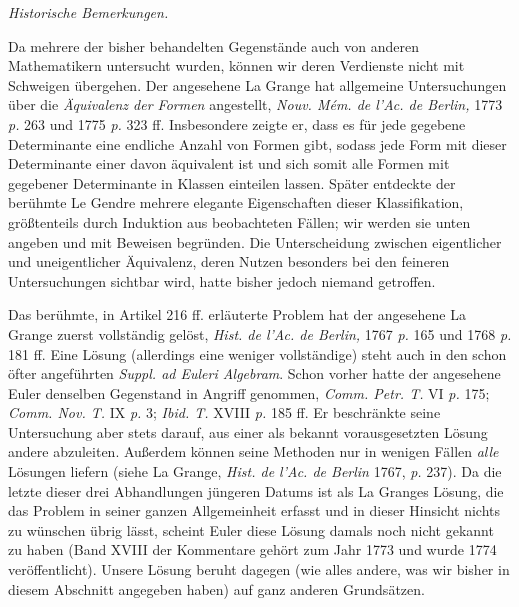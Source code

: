 \begin{center}
\textit{Historische Bemerkungen.}
\end{center}

Da mehrere der bisher behandelten Gegenstände auch von anderen Mathematikern untersucht wurden, können wir deren Verdienste nicht mit Schweigen übergehen. Der angesehene La Grange hat allgemeine Untersuchungen über die \textit{Äquivalenz der Formen} angestellt, \textit{Nouv. M\'em. de l'Ac. de Berlin,} 1773 \textit{p.} 263 und 1775 \textit{p.} 323 ff. Insbesondere zeigte er, dass es für jede gegebene Determinante eine endliche Anzahl von Formen gibt, sodass jede Form mit dieser Determinante einer davon äquivalent ist und sich somit alle Formen mit gegebener Determinante in Klassen einteilen lassen. Später entdeckte der berühmte Le Gendre mehrere elegante Eigenschaften dieser Klassifikation, größtenteils durch Induktion aus beobachteten Fällen; wir werden sie unten angeben und mit Beweisen begründen. Die Unterscheidung zwischen eigentlicher und uneigentlicher Äquivalenz, deren Nutzen besonders bei den feineren Untersuchungen sichtbar wird, hatte bisher jedoch niemand getroffen.

Das berühmte, in Artikel 216 ff. erläuterte Problem hat der angesehene La Grange zuerst vollständig gelöst, \textit{Hist. de l'Ac. de Berlin,} 1767 \textit{p.} 165 und 1768 \textit{p.} 181 ff. Eine Lösung (allerdings eine weniger vollständige) steht auch in den schon öfter angeführten \textit{Suppl. ad Euleri Algebram}. Schon vorher hatte der angesehene Euler denselben Gegenstand in Angriff genommen, \textit{Comm. Petr. T.} VI \textit{p.} 175; \textit{Comm. Nov. T.} IX \textit{p.} 3; \textit{Ibid. T.} XVIII \textit{p.} 185 ff. Er beschränkte seine Untersuchung aber stets darauf, aus einer als bekannt vorausgesetzten Lösung andere abzuleiten. Außerdem können seine Methoden nur in wenigen Fällen \textit{alle} Lösungen liefern (siehe La Grange, \textit{Hist. de l'Ac. de Berlin} 1767, \textit{p.} 237). Da die letzte dieser drei Abhandlungen jüngeren Datums ist als La Granges Lösung, die das Problem in seiner ganzen Allgemeinheit erfasst und in dieser Hinsicht nichts zu wünschen übrig lässt, scheint Euler diese Lösung damals noch nicht gekannt zu haben (Band XVIII der Kommentare gehört zum Jahr 1773 und wurde 1774 veröffentlicht). Unsere Lösung beruht dagegen (wie alles andere, was wir bisher in diesem Abschnitt angegeben haben) auf ganz anderen Grundsätzen.

